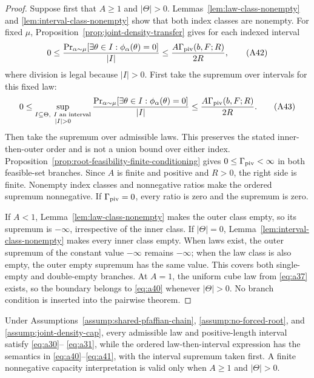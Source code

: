 \begin{proof}
Suppose first that $A\geq1$ and $|\Theta|>0$.
Lemmas~\ref{lem:law-class-nonempty} and
\ref{lem:interval-class-nonempty} show that both index classes are
nonempty.  For fixed $\mu$, Proposition~\ref{prop:joint-density-transfer}
gives for each indexed interval
\[
0\leq
\frac{\Pr_{\alpha\sim\mu}[\exists\theta\in I:
\phi_\alpha(\theta)=0]}{|I|}
\leq\frac{A\Gamma_{\rm piv}(b,F;R)}{2R},
\tag{A42}\label{eq:a42}
\]
where division is legal because $|I|>0$.  First take the supremum over
intervals for this fixed law:
\[
0\leq
\sup_{\substack{I\subseteq\Theta,\ I\text{ an interval}\\|I|>0}}
\frac{\Pr_{\alpha\sim\mu}[\exists\theta\in I:
\phi_\alpha(\theta)=0]}{|I|}
\leq\frac{A\Gamma_{\rm piv}(b,F;R)}{2R}.
\tag{A43}\label{eq:a43}
\]
Then take the supremum over admissible laws.  This preserves the stated
inner-then-outer order and is not a union bound over either index.
Proposition~\ref{prop:root-feasibility-finite-conditioning} gives
$0\leq\Gamma_{\rm piv}<\infty$ in both feasible-set branches.  Since $A$
is finite and positive and $R>0$, the right side is finite.  Nonempty index
classes and nonnegative ratios make the ordered supremum nonnegative.  If
$\Gamma_{\rm piv}=0$, every ratio is zero and the supremum is zero.

If $A<1$, Lemma~\ref{lem:law-class-nonempty} makes the outer class empty,
so its supremum is $-\infty$, irrespective of the inner class.  If
$|\Theta|=0$, Lemma~\ref{lem:interval-class-nonempty} makes every inner
class empty.  When laws exist, the outer supremum of the constant value
$-\infty$ remains $-\infty$; when the law class is also empty, the outer
empty supremum has the same value.  This covers both single-empty and
double-empty branches.  At $A=1$, the uniform cube law from
\eqref{eq:a37} exists, so the boundary belongs to \eqref{eq:a40} whenever
$|\Theta|>0$.  No branch condition is inserted into the pairwise theorem.
\end{proof}

\begin{proposition}
\label{prop:density-and-uniform-consequence}
Under Assumptions~\ref{assump:shared-pfaffian-chain},
\ref{assump:no-forced-root}, and \ref{assump:joint-density-cap}, every
admissible law and positive-length interval satisfy \eqref{eq:a30}--
\eqref{eq:a31}, while the ordered law-then-interval expression has the
semantics in \eqref{eq:a40}--\eqref{eq:a41}, with the interval supremum
taken first.  A finite nonnegative capacity interpretation is valid only
when $A\geq1$ and $|\Theta|>0$.
\end{proposition}

